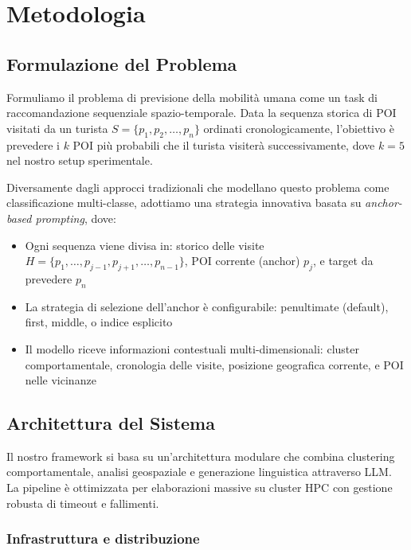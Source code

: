 \chapter{Metodologia}

\section{Formulazione del Problema}

Formuliamo il problema di previsione della mobilità umana come un task di raccomandazione sequenziale spazio-temporale. Data la sequenza storica di POI visitati da un turista $S = \{p_1, p_2, \dots, p_n\}$ ordinati cronologicamente, l'obiettivo è prevedere i $k$ POI più probabili che il turista visiterà successivamente, dove $k=5$ nel nostro setup sperimentale.

Diversamente dagli approcci tradizionali che modellano questo problema come classificazione multi-classe, adottiamo una strategia innovativa basata su \textit{anchor-based prompting}, dove:

\begin{itemize}
\item Ogni sequenza viene divisa in: storico delle visite $H = \{p_1, \dots, p_{j-1}, p_{j+1}, \dots, p_{n-1}\}$, POI corrente (anchor) $p_j$, e target da prevedere $p_n$
\item La strategia di selezione dell'anchor è configurabile: penultimate (default), first, middle, o indice esplicito
\item Il modello riceve informazioni contestuali multi-dimensionali: cluster comportamentale, cronologia delle visite, posizione geografica corrente, e POI nelle vicinanze
\end{itemize}

\section{Architettura del Sistema}

Il nostro framework si basa su un'architettura modulare che combina clustering comportamentale, analisi geospaziale e generazione linguistica attraverso LLM. La pipeline è ottimizzata per elaborazioni massive su cluster HPC con gestione robusta di timeout e fallimenti.

\subsection{Infrastruttura e distribuzione}

